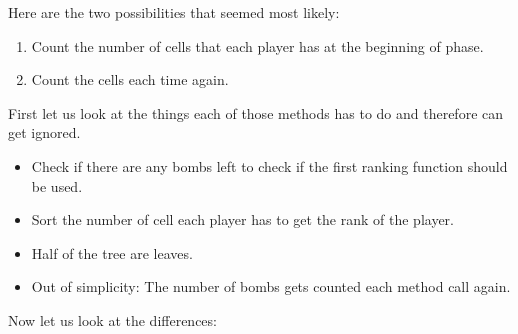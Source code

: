 \noindent Here are the two possibilities that seemed most likely:
\begin{enumerate}
	\item Count the number of cells that each player has at the beginning of phase. 
	\item Count the cells each time again.
\end{enumerate}

\noindent First let us look at the things each of those methods has to do and therefore can get ignored.\\
\begin{itemize}
	\item Check if there are any bombs left to check if the first ranking function should be used.
	\item Sort the number of cell each player has to get the rank of the player.
	\item Half of the tree are leaves.
	\item Out of simplicity: The number of bombs gets counted each method call again.
\end{itemize}

\noindent Now let us look at the differences: \\


